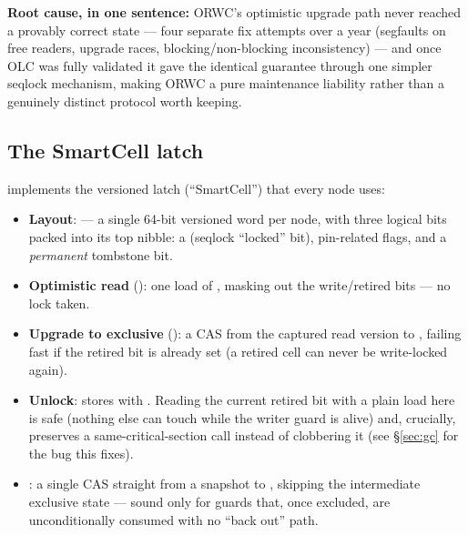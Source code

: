 \documentclass[11pt]{article}
\begin{document}
\textbf{Root cause, in one sentence:} ORWC's optimistic upgrade path never reached a
provably correct state --- four separate fix attempts over a year (segfaults on free
readers, upgrade races, blocking/non-blocking inconsistency) --- and once OLC was fully
validated it gave the identical guarantee through one simpler seqlock mechanism, making
ORWC a pure maintenance liability rather than a genuinely distinct protocol worth
keeping.

\subsection{The SmartCell latch}

 implements the versioned latch (``SmartCell'') that
every node uses:

\begin{itemize}
  \item \textbf{Layout}: 
        --- a single 64-bit versioned word per node, with three logical bits packed into
        its top nibble: a  (seqlock ``locked'' bit), pin-related
        flags, and a \emph{permanent}  tombstone bit.
  \item \textbf{Optimistic read} (): one  load of
        , masking out the write/retired bits --- no lock taken.
  \item \textbf{Upgrade to exclusive} (): a CAS from the
        captured read version to , failing fast
        if the retired bit is already set (a retired cell can never be write-locked
        again).
  \item \textbf{Unlock}: stores 
        with . Reading the current retired bit with a plain 
        load here is safe (nothing else can touch  while the writer
        guard is alive) and, crucially, preserves a same-critical-section
         call instead of clobbering it (see \S\ref{sec:gc} for the
        bug this fixes).
  \item \textbf{}: a single CAS straight from a  snapshot
        to , skipping the intermediate exclusive
        state --- sound only for guards that, once excluded, are unconditionally consumed
        with no ``back out'' path.
\end{itemize}
\end{document}
